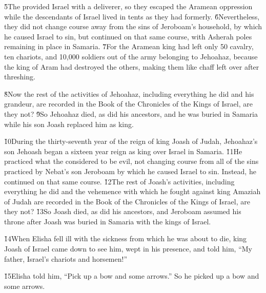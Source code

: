 \v{5}The  provided Israel with a deliverer, so they escaped the Aramean oppression while the descendants of Israel lived in tents as they had formerly. \v{6}Nevertheless, they did not change course away from the sins of Jeroboam's household, by which he caused Israel to sin, but continued on that same course, with Asherah poles remaining in place in Samaria. \v{7}For the Aramean king had left only 50 cavalry, ten chariots, and 10,000 soldiers out of the army belonging to Jehoahaz, because the king of Aram had destroyed the others, making them like chaff left over after threshing.

\v{8}Now the rest of the activities of Jehoahaz, including everything he did and his grandeur, are recorded in the Book of the Chronicles of the Kings of Israel, are they not? \v{9}So Jehoahaz died, as did his ancestors, and he was buried in Samaria while his son Joash replaced him as king.

\v{10}During the thirty-seventh year of the reign of king Joash of Judah, Jehoahaz's son Jehoash began a sixteen year reign as king over Israel in Samaria. \v{11}He practiced what the  considered to be evil, not changing course from all of the sins practiced by Nebat's son Jeroboam by which he caused Israel to sin. Instead, he continued on that same course. \v{12}The rest of Joash's activities, including everything he did and the vehemence with which he fought against king Amaziah of Judah are recorded in the Book of the Chronicles of the Kings of Israel, are they not? \v{13}So Joash died, as did his ancestors, and Jeroboam assumed his throne after Joash was buried in Samaria with the kings of Israel.

\v{14}When Elisha fell ill with the sickness from which he was about to die, king Joash of Israel came down to see him, wept in his presence, and told him, ``My father, Israel's chariots and horsemen!''

\v{15}Elisha told him, ``Pick up a bow and some arrows.'' So he picked up a bow and some arrows.

